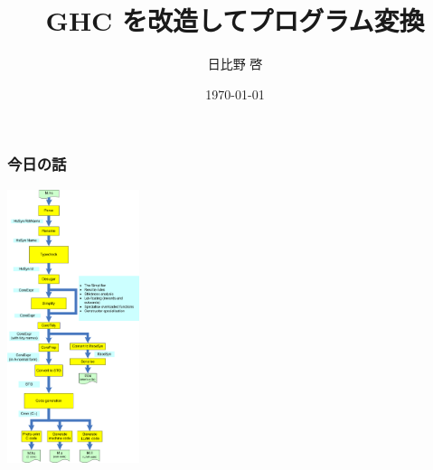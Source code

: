 \documentclass[cjk,dvipdfm,14pt]{beamer}
\title{GHC を改造してプログラム変換}
\author{日比野 啓}
\date{ \today }
\begin{document}
\lstset{language=Haskell,basicstyle=\small\ttfamily}

\begin{frame}

\maketitle

\end{frame}


\begin{frame}[fragile]
\frametitle{今日の話}

\includegraphics[height=8cm]{./hscpipe2.png}

\end{frame}
\end{document}
